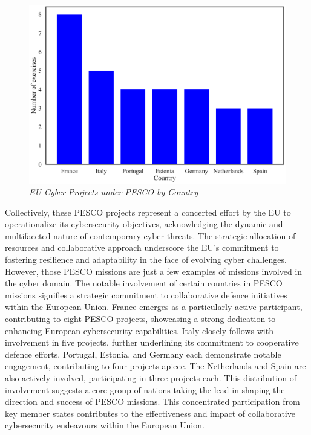\begin{figure}[H]
    \centering
    \includegraphics[width=1\textwidth]{Images/cyber_exercises.png}
    \caption{\textit{EU Cyber Projects under PESCO by Country}}
    \label{fig:cyber_exercises}
\end{figure}

Collectively, these PESCO projects represent a concerted effort by the EU to operationalize its cybersecurity objectives, acknowledging the dynamic and multifaceted nature of contemporary cyber threats. The strategic allocation of resources and collaborative approach underscore the EU's commitment to fostering resilience and adaptability in the face of evolving cyber challenges. However, those PESCO missions are just a few examples of missions involved in the cyber domain. The notable involvement of certain countries in PESCO missions signifies a strategic commitment to collaborative defence initiatives within the European Union. France emerges as a particularly active participant, contributing to eight PESCO projects, showcasing a strong dedication to enhancing European cybersecurity capabilities. Italy closely follows with involvement in five projects, further underlining its commitment to cooperative defence efforts. Portugal, Estonia, and Germany each demonstrate notable engagement, contributing to four projects apiece. The Netherlands and Spain are also actively involved, participating in three projects each. This distribution of involvement suggests a core group of nations taking the lead in shaping the direction and success of PESCO missions. This concentrated participation from key member states contributes to the effectiveness and impact of collaborative cybersecurity endeavours within the European Union.

